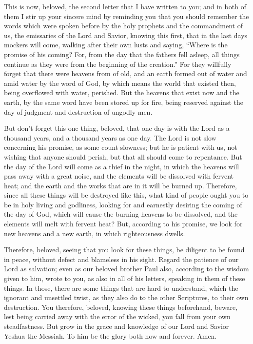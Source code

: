 \mychapter{} \myverse*{}This is now, beloved, the second letter that I have written to
you; and in both of them I stir up your sincere mind by reminding you
\myverse{}that you should remember the words which were spoken before by the holy prophets
and the commandment of us, the emissaries of the Lord and Savior,
\myverse{}knowing this first, that in the last days mockers will come, walking after their
own lusts
\myverse{}and saying, “Where is the promise of his coming? For, from the day that the
fathers fell asleep, all things continue as they were from the beginning of the creation.”
\myverse{}For they willfully forget that there were heavens from of old, and an earth
formed out of water and amid water by the word of God,
\myverse{}by which means the world that existed then, being overflowed with water, perished.
\myverse{}But the heavens that exist now and the earth, by the same word have been stored
up for fire, being reserved against the day of judgment and destruction of ungodly men.

\myverse{}But don’t forget this one thing, beloved, that one day is with
the Lord as a thousand years, and a thousand years as one day.
\myverse{}The Lord is not slow concerning his promise, as some count slowness; but he
is patient with us, not wishing that anyone should perish, but that all should come to repentance.
\myverse{}But the day of the Lord will come as a thief in the night, in which the heavens
will pass away with a great noise, and the elements will be dissolved with fervent heat; and the earth
and the works that are in it will be burned up.
\myverse{}Therefore, since all these things will be destroyed like this, what kind of
people ought you to be in holy living and godliness,
\myverse{}looking for and earnestly desiring the coming of the day of God, which will
cause the burning heavens to be dissolved, and the elements will melt with fervent heat?
\myverse{}But, according to his promise, we look for new heavens and a new earth, in
which righteousness dwells.

\myverse{}Therefore, beloved, seeing that you look for these things, be
diligent to be found in peace, without defect and blameless in his sight.
\myverse{}Regard the patience of our Lord as salvation; even as our beloved brother
Paul also, according to the wisdom given to him, wrote to you,
\myverse{}as also in all of his letters, speaking in them of these things. In those,
there are some things that are hard to understand, which the ignorant and unsettled twist, as they also
do to the other Scriptures, to their own destruction.
\myverse{}You therefore, beloved, knowing these things beforehand, beware, lest being
carried away with the error of the wicked, you fall from your own steadfastness.
\myverse{}But grow in the grace and knowledge of our Lord and Savior Yeshua the Messiah.
To him be the glory both now and forever. Amen.



